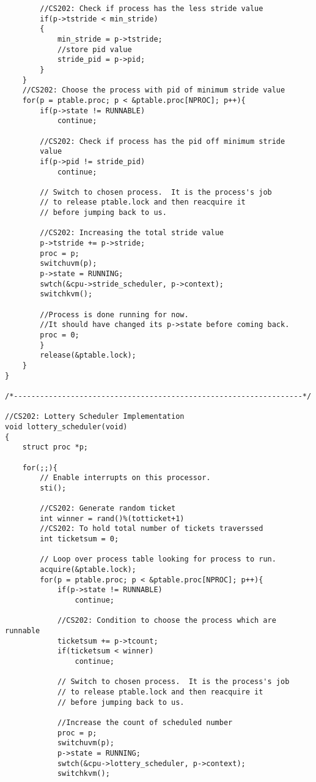 \documentclass[a4paper, 10pt]{article}
\begin{document}
\begin{lstlisting}
        //CS202: Check if process has the less stride value
        if(p->tstride < min_stride)
        {
            min_stride = p->tstride;
            //store pid value
            stride_pid = p->pid;
        }
    }
    //CS202: Choose the process with pid of minimum stride value
    for(p = ptable.proc; p < &ptable.proc[NPROC]; p++){
        if(p->state != RUNNABLE)
            continue;

        //CS202: Check if process has the pid off minimum stride
        value
        if(p->pid != stride_pid)
            continue;

        // Switch to chosen process.  It is the process's job
        // to release ptable.lock and then reacquire it
        // before jumping back to us.

        //CS202: Increasing the total stride value
        p->tstride += p->stride; 
        proc = p;
        switchuvm(p);
        p->state = RUNNING;
        swtch(&cpu->stride_scheduler, p->context);
        switchkvm();

        //Process is done running for now.
        //It should have changed its p->state before coming back.
        proc = 0;
        }
        release(&ptable.lock);
    }
}

/*------------------------------------------------------------------*/

//CS202: Lottery Scheduler Implementation
void lottery_scheduler(void)
{
    struct proc *p;

    for(;;){
        // Enable interrupts on this processor.
        sti();

        //CS202: Generate random ticket
        int winner = rand()%(totticket+1)
        //CS202: To hold total number of tickets traverssed
        int ticketsum = 0;

        // Loop over process table looking for process to run.
        acquire(&ptable.lock);
        for(p = ptable.proc; p < &ptable.proc[NPROC]; p++){
            if(p->state != RUNNABLE)
                continue;

            //CS202: Condition to choose the process which are runnable
            ticketsum += p->tcount;
            if(ticketsum < winner)
                continue;

            // Switch to chosen process.  It is the process's job
            // to release ptable.lock and then reacquire it
            // before jumping back to us.

            //Increase the count of scheduled number
            proc = p;
            switchuvm(p);
            p->state = RUNNING;
            swtch(&cpu->lottery_scheduler, p->context);
            switchkvm();


\end{lstlisting}
\end{document}
